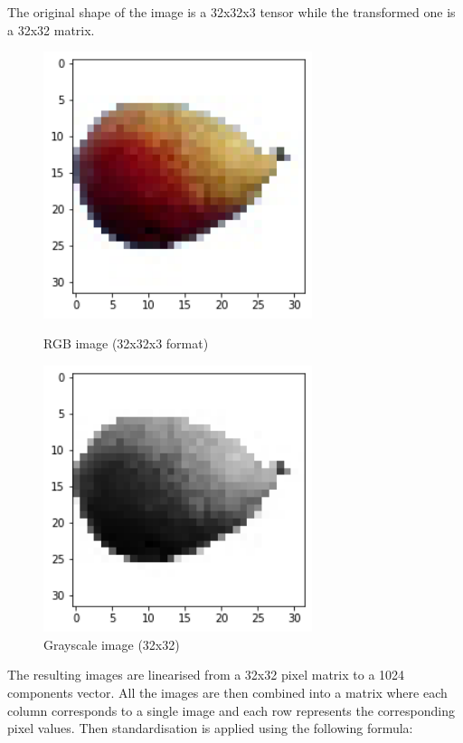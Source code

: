 \documentclass[10pt,english, openany]{book}
\begin{document}
The original shape of the image is a 32x32x3 tensor while the transformed one is a 32x32 matrix.

\begin{figure}[h]
  \centering
  \begin{minipage}[b]{0.48\textwidth}
    \includegraphics[width=0.7\textwidth]{Images/1.1.1 Pca and feed forward NN color.png}
    \caption{RGB image (32x32x3 format)}
  \end{minipage}
  \hfill
  \begin{minipage}[b]{0.48\textwidth}
    \includegraphics[width=0.7\textwidth]{Images/1.1.2 PCA and FFNN greyscale.png}
    \caption{Grayscale image (32x32)}
  \end{minipage}
\end{figure}

The resulting images are linearised from a 32x32 pixel matrix to a 1024 components vector. All the images are then combined into a matrix where each column corresponds to a single image and each row represents the corresponding pixel values. Then standardisation is applied using the following formula:
\end{document}
